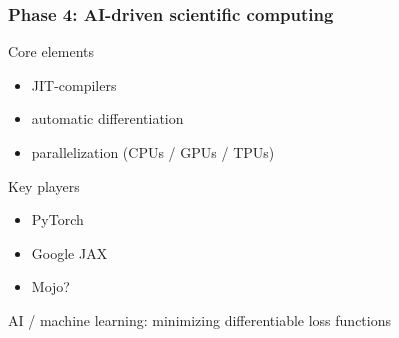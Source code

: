 \documentclass[
    xcolor={svgnames,dvipsnames},
    hyperref={colorlinks, citecolor=DeepPink4, linkcolor=DarkRed, urlcolor=DarkBlue}
    ]{beamer}  %
\newcommand{\1}{\mathbbm 1}
\begin{document}
\begin{frame}
    \frametitle{Phase 4: AI-driven scientific computing}

    Core elements
    \begin{itemize}
        \item JIT-compilers
        \vspace{0.5em}
        \item automatic differentiation
        \vspace{0.5em}
        \item parallelization (CPUs / GPUs / TPUs)
    \end{itemize}

    Key players
    \begin{itemize}
        \item PyTorch 
        \vspace{0.5em}
        \item Google JAX
        \vspace{0.5em}
        \item Mojo?
    \end{itemize}
    
\end{frame}

\begin{frame}
    

    AI / machine learning: minimizing differentiable loss functions
    
    \begin{figure}
       \begin{center}
       \end{center}
    \end{figure}


\end{frame}
\end{document}
